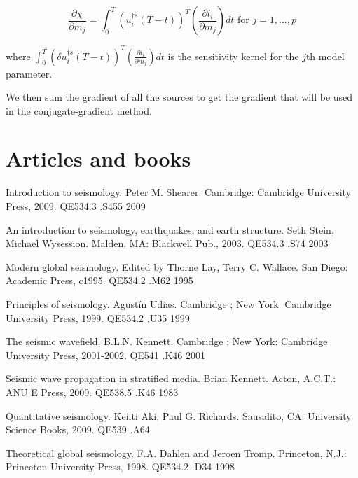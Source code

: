 \documentclass{article}
\begin{document}
\begin{equation}
	\frac{\partial \chi}{\partial m_j} = \int_0^T \left( u_i^{\dagger s} (T - t) \right) ^{T} \left( \frac{\partial l_i}{\partial m_j} \right) dt \text{ for } j = 1, ... , p
\end{equation}

where $\int_0^T \left( \delta u_i^{\dagger s} (T - t) \right) ^{T} \left( \frac{\partial l_i}{\partial m_j} \right) dt$ is the sensitivity kernel for the $j$th model parameter.

We then sum the gradient of all the sources to get the gradient that will be used in the conjugate-gradient method.

\section{Articles and books}

Introduction to seismology. Peter M. Shearer. Cambridge: Cambridge University Press, 2009. QE534.3 .S455 2009

An introduction to seismology, earthquakes, and earth structure. Seth Stein, Michael Wysession. Malden, MA: Blackwell Pub., 2003. QE534.3 .S74 2003

Modern global seismology. Edited by Thorne Lay, Terry C. Wallace. San Diego: Academic Press, c1995. QE534.2 .M62 1995

Principles of seismology. Agust\'in Udias. Cambridge ; New York: Cambridge University Press, 1999. QE534.2 .U35 1999

The seismic wavefield. B.L.N. Kennett. Cambridge ; New York: Cambridge University Press, 2001-2002. QE541 .K46 2001 

Seismic wave propagation in stratified media. Brian Kennett. Acton, A.C.T.: ANU E Press, 2009. QE538.5 .K46 1983 

Quantitative seismology. Keiiti Aki, Paul G. Richards. Sausalito, CA: University Science Books, 2009. QE539 .A64 

Theoretical global seismology. F.A. Dahlen and Jeroen Tromp. Princeton, N.J.: Princeton University Press, 1998. QE534.2 .D34 1998 
\end{document}
